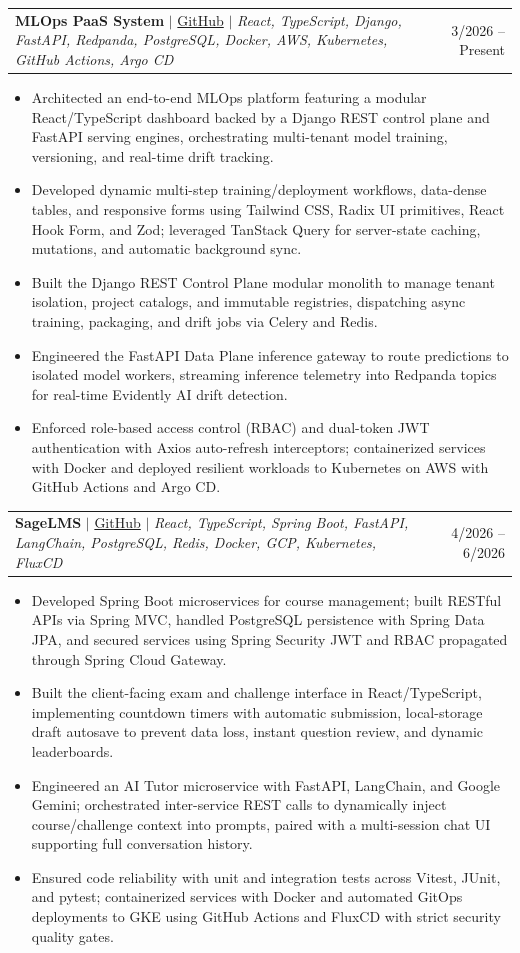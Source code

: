 \documentclass[letterpaper,11pt]{article}
\makeatletter
\newcommand{\resumeItem}[1]{
  \item\small{{#1 \vspace{-2pt}}}
}
\newcommand{\resumeProjectHeading}[2]{
    \item
    \begin{tabular*}{0.97\textwidth}{p{0.78\textwidth}@{\extracolsep{\fill}}r}
      \small#1 & #2 \\
    \end{tabular*}\vspace{-7pt}
}
\newcommand{\resumeItemListStart}{\begin{itemize}[leftmargin=0.18in]}
\newcommand{\resumeItemListEnd}{\end{itemize}\vspace{-5pt}}
\makeatother
\begin{document}
\resumeProjectHeading
{\textbf{MLOps PaaS System} $|$ \href{https://github.com/Viet-Hoang-2005/mlops-paas-system}{GitHub} $|$ \emph{React, TypeScript, Django, FastAPI, Redpanda, PostgreSQL, Docker, AWS, Kubernetes, GitHub Actions, Argo CD}}
{3/2026 -- Present}
\resumeItemListStart
\resumeItem{Architected an end-to-end MLOps platform featuring a modular React/TypeScript dashboard backed by a Django REST control plane and FastAPI serving engines, orchestrating multi-tenant model training, versioning, and real-time drift tracking.}
\resumeItem{Developed dynamic multi-step training/deployment workflows, data-dense tables, and responsive forms using Tailwind CSS, Radix UI primitives, React Hook Form, and Zod; leveraged TanStack Query for server-state caching, mutations, and automatic background sync.}
\resumeItem{Built the Django REST Control Plane modular monolith to manage tenant isolation, project catalogs, and immutable registries, dispatching async training, packaging, and drift jobs via Celery and Redis.}
\resumeItem{Engineered the FastAPI Data Plane inference gateway to route predictions to isolated model workers, streaming inference telemetry into Redpanda topics for real-time Evidently AI drift detection.}
\resumeItem{Enforced role-based access control (RBAC) and dual-token JWT authentication with Axios auto-refresh interceptors; containerized services with Docker and deployed resilient workloads to Kubernetes on AWS with GitHub Actions and Argo CD.}
\resumeItemListEnd

\resumeProjectHeading
{\textbf{SageLMS} $|$ \href{https://github.com/daithang59/sagelms}{GitHub} $|$ \emph{React, TypeScript, Spring Boot, FastAPI, LangChain, PostgreSQL, Redis, Docker, GCP, Kubernetes, FluxCD}}
{4/2026 -- 6/2026}
\resumeItemListStart
\resumeItem{Developed Spring Boot microservices for course management; built RESTful APIs via Spring MVC, handled PostgreSQL persistence with Spring Data JPA, and secured services using Spring Security JWT and RBAC propagated through Spring Cloud Gateway.}
\resumeItem{Built the client-facing exam and challenge interface in React/TypeScript, implementing countdown timers with automatic submission, local-storage draft autosave to prevent data loss, instant question review, and dynamic leaderboards.}
\resumeItem{Engineered an AI Tutor microservice with FastAPI, LangChain, and Google Gemini; orchestrated inter-service REST calls to dynamically inject course/challenge context into prompts, paired with a multi-session chat UI supporting full conversation history.}
\resumeItem{Ensured code reliability with unit and integration tests across Vitest, JUnit, and pytest; containerized services with Docker and automated GitOps deployments to GKE using GitHub Actions and FluxCD with strict security quality gates.}
\resumeItemListEnd
\end{document}
